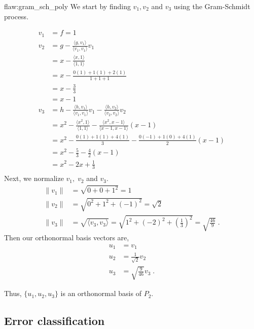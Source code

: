\clearpage
\begin{flaw}{flaw:gram_sch_poly} %
We start by finding $v_1, v_2$ and $v_3$ using the Gram-Schmidt process.

\begin{align*}
    v_1 &= f = 1 \\
    v_2 &= g - \frac{\langle g,v_1 \rangle}{\langle v_1, v_1 \rangle}v_1 \\
    &= x - \frac{\langle x,1 \rangle}{\langle 1, 1 \rangle} \\
    &= x - \frac{0(1) + 1(1) + 2(1)}{1+1+1}\\
    &= x - \frac{3}{3} \\
    &= x - 1 \\
    v_3 &= h - \frac{\langle h,v_1 \rangle}{\langle v_1, v_1 \rangle}v_1 - \frac{\langle h,v_2 \rangle}{\langle v_2, v_2 \rangle}v_2 \\
    &= x^2 - \frac{\langle x^2,1 \rangle}{\langle 1, 1 \rangle} - \frac{\langle x^2,x-1 \rangle}{\langle x-1, x-1 \rangle}(x-1) \\
    &= x^2 - \frac{0(1) + 1(1) + 4(1)}{3} - \frac{0(-1) + 1(0) + 4(1)}{2}(x-1)\\
    &= x^2 - \frac{5}{3} - \frac{4}{2}(x-1) \\
    &= x^2 - 2x + \frac{1}{3} \\
\end{align*}
Next, we normalize $v_1, \; v_2$ and $v_3.$
\begin{align*}
    \lVert v_1 \rVert &= \sqrt{0 + 0 + 1^2} = 1 \\
    \lVert v_2 \rVert &= \sqrt{0^2 + 1^2 + (-1)^2} = \sqrt{2} \\
    \lVert v_3 \rVert &= \sqrt{\langle v_3, v_3 \rangle} = \sqrt{1^2 + (-2)^2 + \left(\frac{1}{3}\right)^2} = \sqrt{\frac{46}{9}}\;.
\end{align*}
Then our orthonormal basis vectors are,
\begin{align*}
    u_1 &= v_1 \\
    u_2 &= \frac{1}{\sqrt{2}}v_2 \\
    u_3 &= \sqrt{\frac{9}{46}}v_3\;.
\end{align*}

\noindent Thus, $\{u_1, u_2, u_3\}$ is an orthonormal basis of $P_2.$
\end{flaw}

\clearpage
\subsection{Error classification}

